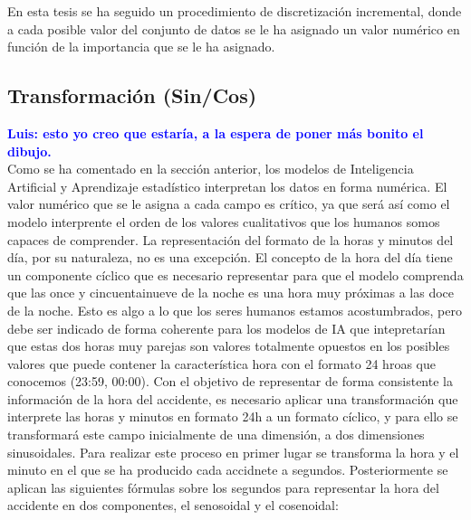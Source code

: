 \documentclass{uathesis-es}
\begin{document}

En esta tesis se ha seguido un procedimiento de discretización incremental, donde a cada posible valor del conjunto de datos se le ha asignado un valor numérico en función de la importancia que se le ha asignado.

\subsection{Transformación (Sin/Cos)}

\textcolor{blue}{\textbf{Luis: esto yo creo que estaría, a la espera de poner más bonito el dibujo.}}\\

Como se ha comentado en la sección anterior, los modelos de Inteligencia Artificial y Aprendizaje estadístico interpretan los datos en forma numérica. El valor numérico que se le asigna a cada campo es crítico, ya que será así como el modelo interprente el orden de los valores cualitativos que los humanos somos capaces de comprender. La representación del formato de la horas y minutos del día, por su naturaleza, no es una excepción. El concepto de la hora del día tiene un componente cíclico que es necesario representar para que el modelo comprenda que las once y cincuentainueve de la noche es una hora muy próximas a las doce de la noche. Esto es algo a lo que los seres humanos estamos acostumbrados, pero debe ser indicado de forma coherente para los modelos de IA que intepretarían que estas dos horas muy parejas son valores totalmente opuestos en los posibles valores que puede contener la característica hora con el formato 24 hroas que conocemos (23:59, 00:00). Con el objetivo de representar de forma consistente la información de la hora del accidente, es necesario aplicar una transformación que interprete las horas y minutos en formato 24h a un formato cíclico, y para ello se transformará este campo inicialmente de una dimensión, a dos dimensiones sinusoidales. Para realizar este proceso en primer lugar se transforma la hora y el minuto en el que se ha producido cada accidnete a segundos. Posteriormente se aplican las siguientes fórmulas sobre los segundos para representar la hora del accidente en dos componentes, el senosoidal y el cosenoidal:
\end{document}
